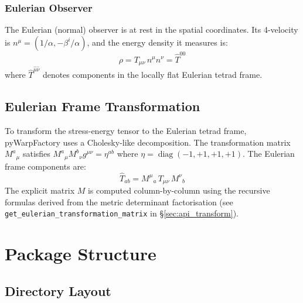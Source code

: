 \documentclass[11pt, a4paper, twoside]{report}
\newcommand{\diag}{\operatorname{diag}}
\begin{document}
\subsection{Eulerian Observer}
The Eulerian (normal) observer is at rest in the spatial coordinates.
Its 4-velocity is $n^\mu = (1/\alpha, -\beta^i/\alpha)$, and the energy
density it measures is:
\begin{equation}
  \rho = T_{\mu\nu}\,n^\mu n^\nu
       = \hat{T}^{00}
  \label{eq:rho_eulerian}
\end{equation}
where $\hat{T}^{\hat\mu\hat\nu}$ denotes components in the locally flat
Eulerian tetrad frame.

\section{Eulerian Frame Transformation}
\label{sec:euleriantf}

To transform the stress-energy tensor to the Eulerian tetrad frame,
pyWarpFactory uses a Cholesky-like decomposition.  The transformation
matrix $M^a{}_\mu$ satisfies $M^a{}_\mu M^b{}_\nu g^{\mu\nu} = \eta^{ab}$
where $\eta = \diag(-1,+1,+1,+1)$.  The Eulerian frame components are:
\begin{equation}
  \hat{T}_{ab} = M^{\mu}{}_{a}\,T_{\mu\nu}\,M^{\nu}{}_{b}
\end{equation}
The explicit matrix $M$ is computed column-by-column using the recursive
formulas derived from the metric determinant factorisation (see
\texttt{get\_eulerian\_transformation\_matrix} in \S\ref{sec:api_transform}).

\chapter{Package Structure}
\label{chap:structure}

\section{Directory Layout}
\end{document}
